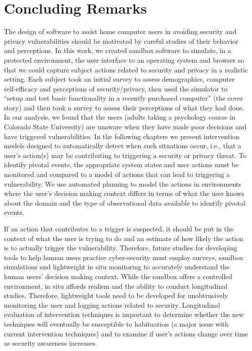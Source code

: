\section{Concluding Remarks}
The design of software to assist home computer users in avoiding security and privacy vulnerabilities should be motivated by careful studies of their behavior and perceptions.
In this work, we created sandbox software to simulate, in a protected environment,
the user interface to an operating system and browser so that we could capture subject actions related to security and privacy in a realistic setting. 
Each subject took an initial survey to assess demographics, computer self-efficacy and perceptions of security/privacy, then used the simulator to ``setup and test basic functionality in a recently purchased computer'' (the cover story) and then took a survey to assess their perceptions of what they had done. 
In our analysis, we found that the users (adults taking a psychology course in Colorado State University) are unaware when they have made poor decisions and have triggered vulnerabilities. 
In the following chapters we present intervention models designed to automatically detect when such situations occur, i.e., that a user’s action(s) may be contributing to triggering a security or privacy threat.
To identify pivotal events, the appropriate system states and user actions must be monitored and compared to a model of actions that can lead to triggering a vulnerability.
We use automated planning to model the actions in environments where the user's decision making context differs in terms of what the user knows about the domain and the type of observational data available to identify pivotal events.

If an action that contributes to a trigger is suspected, it should be put in the context of what the user is trying to do and an estimate of how likely the action is to actually trigger the vulnerability.
Therefore, future studies for developing tools to help human users practice cyber-security must employ surveys, sandbox simulations and lightweight in situ monitoring to accurately understand the human users' decision making context. 
While the sandbox offers a controlled environment, in situ affords realism and the ability to conduct longitudinal studies. Therefore, lightweight tools need to be developed for unobtrusively monitoring the user and logging actions related to security. Longitudinal evaluation of intervention techniques is important to determine whether the new techniques will eventually be susceptible to
habituation (a major issue with current intervention techniques) and to examine if user’s actions change over time as security awareness increases.

